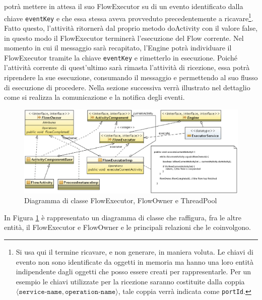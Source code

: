 
potrà mettere in attesa il suo FlowExecutor su di un evento identificato dalla
chiave \texttt{eventKey} e che essa stessa aveva provveduto precedentemente a
ricavare\footnote{Si usa qui il termine ricavare, e non generare, in maniera
voluta. Le chiavi di evento non sono identificate da oggetti in memoria ma hanno
una loro entità indipendente
  dagli oggetti che posso essere creati per rappresentarle. Per un esempio le
  chiavi utilizzate per la ricezione saranno costituite dalla coppia
  $\langle \texttt{service-name}, \texttt{operation-name} \rangle$, tale coppia
  verrà indicata come \texttt{portId}.}. Fatto questo, l'attività ritornerà dal proprio
metodo doActivity con il valore false, in questo modo il FlowExecutor terminerà
l'esecuzione del Flow corrente. Nel momento in cui il messaggio sarà recapitato,
l'Engine potrà individuare il FlowExecutor tramite la chiave \texttt{eventKey} e
rimetterlo in esecuzione. Poiché l'attività corrente di quest'ultimo sarà rimasta
l'attività di ricezione, essa potrà riprendere la sue esecuzione, consumando il
messaggio e permettendo al suo flusso di esecuzione di procedere. Nella sezione
successiva verrà illustrato nel dettaglio come si realizza la comunicazione e la
notifica degli eventi.

\begin{figure}[!t]
\begin{center}
\includegraphics[angle=90,scale=0.626,clip]
{architettura_interna/dia/flowClassDiagram}
\caption[Diagramma di classe FlowExecutor \ldots] {
   	Diagramma di classe FlowExecutor, FlowOwner e ThreadPool}
  \label{fig:flowclass}
\end{center}
\end{figure}

In Figura \ref{fig:flowclass} \`e rappresentato un diagramma di classe che
raffigura, fra le altre entità, il FlowExecutor e FlowOwner e le principali
relazioni che le coinvolgono.

